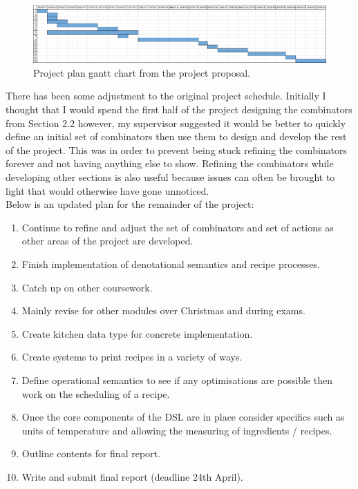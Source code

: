 \documentclass[11pt]{article}
\begin{document}
    \begin{figure}[ht]
        \centering
            \includegraphics[width=\textwidth,keepaspectratio]{gantt_chart.jpg}
        \caption{Project plan gantt chart from the project proposal.}
    \end{figure}

    There has been some adjustment to the original project schedule. Initially I thought that I would spend
    the first half of the project designing the combinators from Section 2.2 however, my supervisor suggested
    it would be better to quickly define an initial set of combinators then use them to design and develop the
    rest of the project. This was in order to prevent being stuck refining the combinators forever and not having
    anything else to show. Refining the combinators while developing other sections is also useful because issues
    can often be brought to light that would otherwise have gone unnoticed. \\

    Below is an updated plan for the remainder of the project:

    \begin{enumerate}

        \item Continue to refine and adjust the set of combinators and set of
        actions as other areas of the project are developed.

        \item Finish implementation of denotational semantics and recipe processes.

        \item Catch up on other coursework.

        \item Mainly revise for other modules over Christmas and during
        exams.

        \item Create kitchen data type for concrete implementation.

        \item Create systems to print recipes in a variety of ways.

        \item Define operational semantics to see if any optimisations are possible
        then work on the scheduling of a recipe.

        \item Once the core components of the DSL are in place
        consider specifics such as units of temperature and allowing the
        measuring of ingredients / recipes.

        \item Outline contents for final report.

        \item Write and submit final report (deadline 24th April).

    \end{enumerate}
\end{document}
